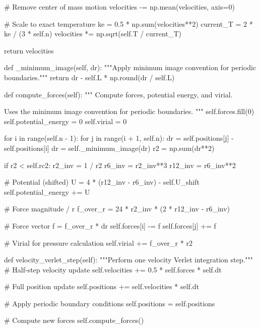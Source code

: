 \documentclass[11pt,a4paper]{article}
\begin{document}
\begin{pycode}
        # Remove center of mass motion
        velocities -= np.mean(velocities, axis=0)

        # Scale to exact temperature
        ke = 0.5 * np.sum(velocities**2)
        current_T = 2 * ke / (3 * self.n)
        velocities *= np.sqrt(self.T / current_T)

        return velocities

    def _minimum_image(self, dr):
        """Apply minimum image convention for periodic boundaries."""
        return dr - self.L * np.round(dr / self.L)

    def compute_forces(self):
        """
        Compute forces, potential energy, and virial.

        Uses the minimum image convention for periodic boundaries.
        """
        self.forces.fill(0)
        self.potential_energy = 0
        self.virial = 0

        for i in range(self.n - 1):
            for j in range(i + 1, self.n):
                dr = self.positions[j] - self.positions[i]
                dr = self._minimum_image(dr)
                r2 = np.sum(dr**2)

                if r2 < self.rc2:
                    r2_inv = 1 / r2
                    r6_inv = r2_inv**3
                    r12_inv = r6_inv**2

                    # Potential (shifted)
                    U = 4 * (r12_inv - r6_inv) - self.U_shift
                    self.potential_energy += U

                    # Force magnitude / r
                    f_over_r = 24 * r2_inv * (2 * r12_inv - r6_inv)

                    # Force vector
                    f = f_over_r * dr
                    self.forces[i] -= f
                    self.forces[j] += f

                    # Virial for pressure calculation
                    self.virial += f_over_r * r2

    def velocity_verlet_step(self):
        """Perform one velocity Verlet integration step."""
        # Half-step velocity update
        self.velocities += 0.5 * self.forces * self.dt

        # Full position update
        self.positions += self.velocities * self.dt

        # Apply periodic boundary conditions
        self.positions = self.positions %

        # Compute new forces
        self.compute_forces()


\end{pycode}
\end{document}

